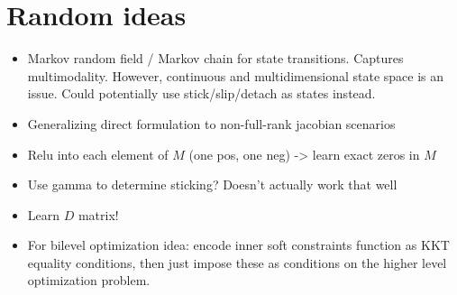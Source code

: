 \documentclass{article}
\begin{document}
\section{Random ideas}
\begin{itemize}
    \item Markov random field / Markov chain for state transitions. Captures multimodality. However, continuous and multidimensional state space is an issue. Could potentially use stick/slip/detach as states instead.
    \item Generalizing direct formulation to non-full-rank jacobian scenarios
    \item Relu into each element of $M$ (one pos, one neg) -> learn exact zeros in $M$
    \item Use gamma to determine sticking? Doesn't actually work that well
    \item Learn $D$ matrix!
    \item For bilevel optimization idea: encode inner soft constraints function as KKT equality conditions, then just impose these as conditions on the higher level optimization problem.
\end{itemize}
\end{document}
